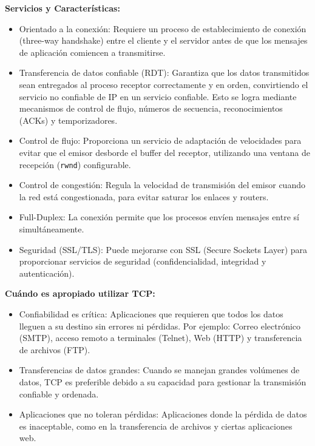 \begin{enumerate}
    \textbf{Servicios y Características:}
    \begin{itemize}
        \item Orientado a la conexión: Requiere un proceso de establecimiento de conexión (three-way handshake) entre el cliente y el servidor antes de que los mensajes de aplicación comiencen a transmitirse.
        \item Transferencia de datos confiable (RDT): Garantiza que los datos transmitidos sean entregados al proceso receptor correctamente y en orden, convirtiendo el servicio no confiable de IP en un servicio confiable. Esto se logra mediante mecanismos de control de flujo, números de secuencia, reconocimientos (ACKs) y temporizadores.
        \item Control de flujo: Proporciona un servicio de adaptación de velocidades para evitar que el emisor desborde el buffer del receptor, utilizando una ventana de recepción (\texttt{rwnd}) configurable.
        \item Control de congestión: Regula la velocidad de transmisión del emisor cuando la red está congestionada, para evitar saturar los enlaces y routers.
        \item Full-Duplex: La conexión permite que los procesos envíen mensajes entre sí simultáneamente.
        \item Seguridad (SSL/TLS): Puede mejorarse con SSL (Secure Sockets Layer) para proporcionar servicios de seguridad (confidencialidad, integridad y autenticación).
    \end{itemize}
    
    \textbf{Cuándo es apropiado utilizar TCP:}
    \begin{itemize}
        \item Confiabilidad es crítica: Aplicaciones que requieren que todos los datos lleguen a su destino sin errores ni pérdidas. Por ejemplo: Correo electrónico (SMTP), acceso remoto a terminales (Telnet), Web (HTTP) y transferencia de archivos (FTP).
        \item Transferencias de datos grandes: Cuando se manejan grandes volúmenes de datos, TCP es preferible debido a su capacidad para gestionar la transmisión confiable y ordenada.
        \item Aplicaciones que no toleran pérdidas: Aplicaciones donde la pérdida de datos es inaceptable, como en la transferencia de archivos y ciertas aplicaciones web.
    \end{itemize}
\end{enumerate}